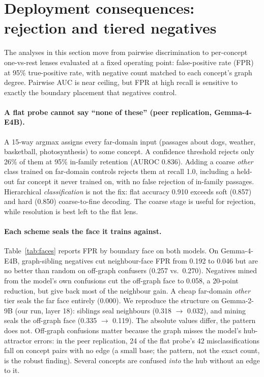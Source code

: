 \documentclass[11pt]{article}
\begin{document}
\section{Deployment consequences: rejection and tiered negatives}
\label{sec:deploy}

The analyses in this section move from pairwise discrimination to per-concept one-vs-rest lenses evaluated at a
fixed operating point: false-positive rate (FPR) at 95\% true-positive rate, with negative count matched to each
concept's graph degree. Pairwise AUC is near ceiling, but FPR at high recall is sensitive to exactly the boundary
placement that negatives control.

\paragraph{A flat probe cannot say ``none of these'' (peer replication, Gemma-4-E4B).} A 15-way argmax assigns every
far-domain input (passages about dogs, weather, basketball, photosynthesis) to some concept. A confidence threshold
rejects only 26\% of them at 95\% in-family retention (AUROC 0.836). Adding a coarse \emph{other} class trained on
far-domain controls rejects them at recall 1.0, including a held-out far concept it never trained on, with no
false rejection of in-family passages. Hierarchical \emph{classification} is not the fix: flat accuracy 0.910
exceeds soft (0.857) and hard (0.850) coarse-to-fine decoding. The coarse stage is useful for rejection, while
resolution is best left to the flat lens.

\paragraph{Each scheme seals the face it trains against.} Table~\ref{tab:faces} reports FPR by boundary face on
both models. On Gemma-4-E4B, graph-sibling negatives cut neighbour-face FPR from 0.192 to 0.046 but are no better
than random on off-graph confusers (0.257 vs.\ 0.270). Negatives mined from the model's own confusions cut the
off-graph face to 0.058, a 20-point reduction, but give back most of the neighbour gain. A cheap far-domain
\emph{other} tier seals the far face entirely (0.000). We reproduce the structure on Gemma-2-9B (our run, layer 18):
siblings seal neighbours (0.318 $\rightarrow$ 0.032), and mining seals the off-graph face (0.335 $\rightarrow$
0.119). The absolute values differ, the pattern does not. Off-graph confusions matter because the graph misses
the model's hub-attractor errors: in the peer replication, 24 of the flat probe's 42 misclassifications fall on
concept pairs with no edge (a small base; the pattern, not the exact count, is the robust finding). Several
concepts are confused \emph{into} the hub without an edge to it.
\end{document}
